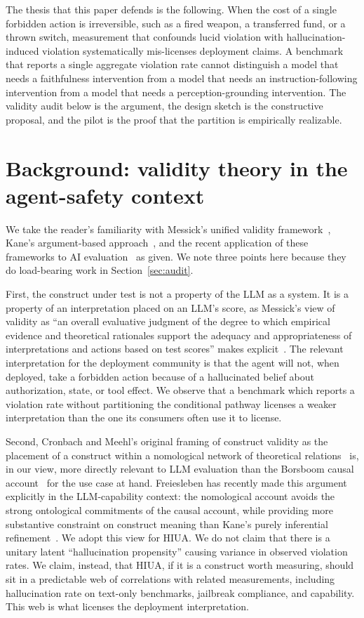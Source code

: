 \documentclass{article}
\begin{document}
The thesis that this paper defends is the following. When the cost of a single forbidden action is irreversible, such as a fired weapon, a transferred fund, or a thrown switch, measurement that confounds lucid violation with hallucination-induced violation systematically mis-licenses deployment claims. A benchmark that reports a single aggregate violation rate cannot distinguish a model that needs a faithfulness intervention from a model that needs an instruction-following intervention from a model that needs a perception-grounding intervention. The validity audit below is the argument, the design sketch is the constructive proposal, and the pilot is the proof that the partition is empirically realizable.

\section{Background: validity theory in the agent-safety context}
We take the reader's familiarity with Messick's unified validity framework~\cite{messick1989}, Kane's argument-based approach~\cite{kane2013}, and the recent application of these frameworks to AI evaluation~\cite{m2m2025, nomologicalnetworks2026} as given. We note three points here because they do load-bearing work in Section~\ref{sec:audit}.

First, the construct under test is not a property of the LLM as a system. It is a property of an interpretation placed on an LLM's score, as Messick's view of validity as ``an overall evaluative judgment of the degree to which empirical evidence and theoretical rationales support the adequacy and appropriateness of interpretations and actions based on test scores'' makes explicit~\cite{messick1989, standards2014}. The relevant interpretation for the deployment community is that the agent will not, when deployed, take a forbidden action because of a hallucinated belief about authorization, state, or tool effect. We observe that a benchmark which reports a violation rate without partitioning the conditional pathway licenses a weaker interpretation than the one its consumers often use it to license.

Second, Cronbach and Meehl's original framing of construct validity as the placement of a construct within a nomological network of theoretical relations~\cite{cronbachmeehl1955} is, in our view, more directly relevant to LLM evaluation than the Borsboom causal account~\cite{borsboom2004} for the use case at hand. Freiesleben has recently made this argument explicitly in the LLM-capability context: the nomological account avoids the strong ontological commitments of the causal account, while providing more substantive constraint on construct meaning than Kane's purely inferential refinement~\cite{nomologicalnetworks2026}. We adopt this view for HIUA. We do not claim that there is a unitary latent ``hallucination propensity'' causing variance in observed violation rates. We claim, instead, that HIUA, if it is a construct worth measuring, should sit in a predictable web of correlations with related measurements, including hallucination rate on text-only benchmarks, jailbreak compliance, and capability. This web is what licenses the deployment interpretation.
\end{document}
